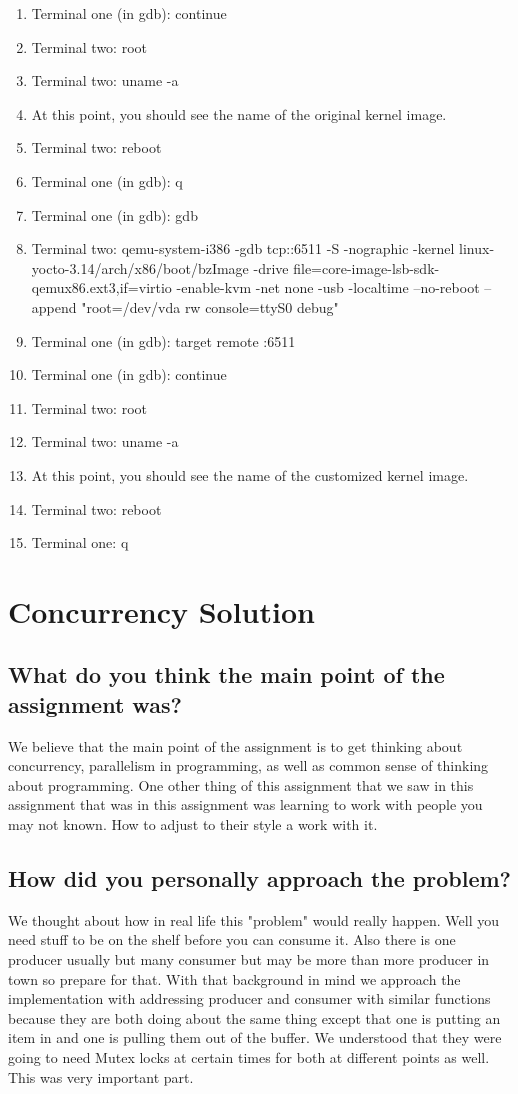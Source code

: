 \documentclass[draftclsnofoot,onecolumn,10pt,compsoc]{IEEEtran}
\begin{document}
\begin{enumerate}
\item Terminal one (in gdb): continue
\item Terminal two: root
\item Terminal two: uname -a
\item At this point, you should see the name of the original kernel image.
\item Terminal two: reboot
\item Terminal one (in gdb): q
\item Terminal one (in gdb): gdb
\item Terminal two: qemu-system-i386 -gdb tcp::6511 -S -nographic -kernel linux-yocto-3.14/arch/x86/boot/bzImage  -drive file=core-image-lsb-sdk-qemux86.ext3,if=virtio -enable-kvm -net none -usb -localtime --no-reboot --append "root=/dev/vda rw console=ttyS0 debug"
\item Terminal one (in gdb): target remote :6511
\item Terminal one (in gdb): continue
\item Terminal two: root
\item Terminal two: uname -a
\item At this point, you should see the name of the customized kernel image.
\item Terminal two: reboot
\item Terminal one: q
	
\end{enumerate}
\section{Concurrency Solution}
\subsection{What do you think the main point of the assignment was?}
We believe that the main point of the assignment is to get thinking about concurrency, parallelism in programming, as well as common sense of thinking about programming.  One other thing of this assignment that we saw in this assignment that was in this assignment was learning to work with people you may not known.  How to adjust to their style a work with it.
\subsection{How did you personally approach the problem?}
We thought about how in real life this "problem" would really happen.  Well you need stuff to be on the shelf before you can consume it.  Also there is one producer usually but many consumer but may be more than more producer in town so prepare for that.  With that background in mind we approach the implementation with addressing producer and consumer with similar functions because they are both doing about the same thing except that one is putting an item in and one is pulling them out of the buffer.  We understood that they were going to need Mutex locks at certain times for both at different points as well.  This was very important part.  
\end{document}

